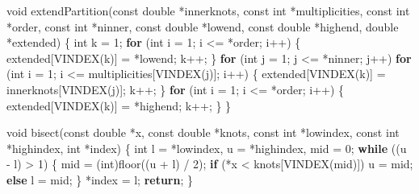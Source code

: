 \documentclass[
  12pt,
]{book}
\newenvironment{Shaded}{\begin{snugshade}}{\end{snugshade}}
\newcommand{\ControlFlowTok}[1]{\textcolor[rgb]{0.13,0.29,0.53}{\textbf{#1}}}
\newcommand{\DataTypeTok}[1]{\textcolor[rgb]{0.13,0.29,0.53}{#1}}
\newcommand{\DecValTok}[1]{\textcolor[rgb]{0.00,0.00,0.81}{#1}}
\newcommand{\NormalTok}[1]{#1}
\theoremstyle{definition}
\theoremstyle{definition}
\theoremstyle{definition}
\theoremstyle{definition}
\theoremstyle{remark}
\begin{document}
\begin{Shaded}
\begin{Highlighting}[]
\DataTypeTok{void}\NormalTok{ extendPartition(}\DataTypeTok{const} \DataTypeTok{double}\NormalTok{ *innerknots, }\DataTypeTok{const} \DataTypeTok{int}\NormalTok{ *multiplicities,}
                     \DataTypeTok{const} \DataTypeTok{int}\NormalTok{ *order, }\DataTypeTok{const} \DataTypeTok{int}\NormalTok{ *ninner, }\DataTypeTok{const} \DataTypeTok{double}\NormalTok{ *lowend,}
                     \DataTypeTok{const} \DataTypeTok{double}\NormalTok{ *highend, }\DataTypeTok{double}\NormalTok{ *extended) \{}
    \DataTypeTok{int}\NormalTok{ k = }\DecValTok{1}\NormalTok{;}
    \ControlFlowTok{for}\NormalTok{ (}\DataTypeTok{int}\NormalTok{ i = }\DecValTok{1}\NormalTok{; i \textless{}= *order; i++) \{}
\NormalTok{        extended[VINDEX(k)] = *lowend;}
\NormalTok{        k++;}
\NormalTok{    \}}
    \ControlFlowTok{for}\NormalTok{ (}\DataTypeTok{int}\NormalTok{ j = }\DecValTok{1}\NormalTok{; j \textless{}= *ninner; j++)}
        \ControlFlowTok{for}\NormalTok{ (}\DataTypeTok{int}\NormalTok{ i = }\DecValTok{1}\NormalTok{; i \textless{}= multiplicities[VINDEX(j)]; i++) \{}
\NormalTok{            extended[VINDEX(k)] = innerknots[VINDEX(j)];}
\NormalTok{            k++;}
\NormalTok{        \}}
    \ControlFlowTok{for}\NormalTok{ (}\DataTypeTok{int}\NormalTok{ i = }\DecValTok{1}\NormalTok{; i \textless{}= *order; i++) \{}
\NormalTok{        extended[VINDEX(k)] = *highend;}
\NormalTok{        k++;}
\NormalTok{    \}}
\NormalTok{\}}

\DataTypeTok{void}\NormalTok{ bisect(}\DataTypeTok{const} \DataTypeTok{double}\NormalTok{ *x, }\DataTypeTok{const} \DataTypeTok{double}\NormalTok{ *knots, }\DataTypeTok{const} \DataTypeTok{int}\NormalTok{ *lowindex,}
            \DataTypeTok{const} \DataTypeTok{int}\NormalTok{ *highindex, }\DataTypeTok{int}\NormalTok{ *index) \{}
    \DataTypeTok{int}\NormalTok{ l = *lowindex, u = *highindex, mid = }\DecValTok{0}\NormalTok{;}
    \ControlFlowTok{while}\NormalTok{ ((u {-} l) \textgreater{} }\DecValTok{1}\NormalTok{) \{}
\NormalTok{        mid = (}\DataTypeTok{int}\NormalTok{)floor((u + l) / }\DecValTok{2}\NormalTok{);}
        \ControlFlowTok{if}\NormalTok{ (*x \textless{} knots[VINDEX(mid)])}
\NormalTok{            u = mid;}
        \ControlFlowTok{else}
\NormalTok{            l = mid;}
\NormalTok{    \}}
\NormalTok{    *index = l;}
    \ControlFlowTok{return}\NormalTok{;}
\NormalTok{\}}


\end{Highlighting}
\end{Shaded}
\end{document}
